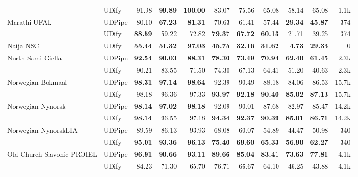 \documentclass[11pt,a4paper]{article}
\begin{document}
\begin{table*}
\begin{center}
\begin{tabular}{@{}llrrrrrrrrr@{}}
               & UDify &      91.98 &  \bf 99.89 &  \bf 100.00 &      83.07 &      75.56 &      65.08 &      58.14 &      65.08 &   1.1k \\
    \addlinespace
    Marathi UFAL & UDPipe &      80.10 &  \bf 67.23 &   \bf 81.31 &      70.63 &      61.41 &      57.44 &  \bf 29.34 &  \bf 45.87 &    374 \\
               & UDify &  \bf 88.59 &      59.22 &       72.82 &  \bf 79.37 &  \bf 67.72 &  \bf 60.13 &      21.71 &      39.25 &    374 \\
    \addlinespace
    Naija NSC & UDify &  \bf 55.44 &  \bf 51.32 &   \bf 97.03 &  \bf 45.75 &  \bf 32.16 &  \bf 31.62 &   \bf 4.73 &  \bf 29.33 &      0 \\
    \addlinespace
    North Sami Giella & UDPipe &  \bf 92.54 &  \bf 90.03 &   \bf 88.31 &  \bf 78.30 &  \bf 73.49 &  \bf 70.94 &  \bf 62.40 &  \bf 61.45 &   2.3k \\
               & UDify &      90.21 &      83.55 &       71.50 &      74.30 &      67.13 &      64.41 &      51.20 &      40.63 &   2.3k \\
    \addlinespace
    Norwegian Bokmaal & UDPipe &  \bf 98.31 &  \bf 97.14 &   \bf 98.64 &      92.39 &      90.49 &      88.18 &      84.06 &      86.53 &  15.7k \\
               & UDify &      98.18 &      96.36 &       97.33 &  \bf 93.97 &  \bf 92.18 &  \bf 90.40 &  \bf 85.02 &  \bf 87.13 &  15.7k \\
    \addlinespace
    Norwegian Nynorsk & UDPipe &  \bf 98.14 &  \bf 97.02 &   \bf 98.18 &      92.09 &      90.01 &      87.68 &      82.97 &      85.47 &  14.2k \\
               & UDify &  \bf 98.14 &      96.55 &       97.18 &  \bf 94.34 &  \bf 92.37 &  \bf 90.39 &  \bf 85.01 &  \bf 86.71 &  14.2k \\
    \addlinespace
    Norwegian NynorskLIA & UDPipe &      89.59 &      86.13 &       93.93 &      68.08 &      60.07 &      54.89 &      44.47 &      50.98 &    340 \\
               & UDify &  \bf 95.01 &  \bf 93.36 &   \bf 96.13 &  \bf 75.40 &  \bf 69.60 &  \bf 65.33 &  \bf 56.90 &  \bf 62.27 &    340 \\
    \addlinespace
    Old Church Slavonic PROIEL & UDPipe &  \bf 96.91 &  \bf 90.66 &   \bf 93.11 &  \bf 89.66 &  \bf 85.04 &  \bf 83.41 &  \bf 73.63 &  \bf 77.81 &   4.1k \\
               & UDify &      84.23 &      71.30 &       65.70 &      76.71 &      66.67 &      64.10 &      46.25 &      43.88 &   4.1k \\

\end{tabular}
\end{center}
\end{table*}
\end{document}
